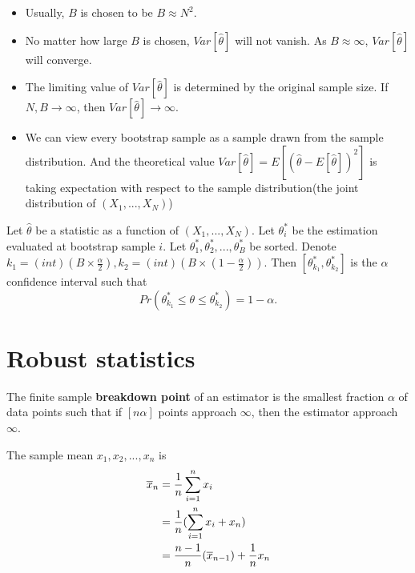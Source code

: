 \begin{refsection}
\begin{remark}[interpretation]\hfill
	\begin{itemize}
		\item Usually, $B$ is chosen to be $B \approx N^2$. 
		\item No matter how large $B$ is chosen, $Var[\hat{\theta}]$ will not vanish. As $B\approx \infty$, $Var[\hat{\theta}]$ will converge.
		\item The limiting value of $Var[\hat{\theta}]$ is determined by the original sample size. If $N,B\to \infty$, then $Var[\hat{\theta}]\to \infty$.
		\item We can view every bootstrap sample as a sample drawn from the sample distribution. And the theoretical value $Var[\hat{\theta}] = E[(\hat{\theta} - E[\hat{\theta}])^2]$ is taking expectation with respect to the sample distribution(the joint distribution of $(X_1,...,X_N)$)
	\end{itemize}
\end{remark}

\begin{definition}
	Let $\hat{\theta}$ be a statistic as a function of $(X_1,...,X_N)$. Let $\theta^*_i$ be the estimation evaluated at bootstrap sample $i$. Let $\theta_1^*,\theta_2^*,...,\theta_B^*$ be sorted.
Denote $k_1 = (int)(B\times \frac{\alpha}{2}),k_2=(int)(B\times (1-\frac{\alpha}{2})).$	
Then $[\theta_{k_1}^*,\theta_{k_2}^*]$ is the $\alpha$ confidence interval such that
$$Pr(\theta_{k_1}^*\leq \theta\leq \theta_{k_2}^*) = 1-\alpha.$$
\end{definition}


\begin{definition}
\end{definition}



\section{Robust statistics}

\begin{definition}
The finite sample \textbf{breakdown point} of an estimator is the smallest fraction $\alpha$ of data points such that if $[n\alpha]$ points approach $\infty$, then the estimator approach $\infty$.	
\end{definition}

\begin{example}
The sample mean $x_1,x_2,...,x_n$ is
\begin{align*}
\overline{x}_n &= \frac{1}{n}\sum_{i=1}^{n} x_i \\
&=\frac{1}{n}(\sum_{i=1}^{n} x_i + x_n) \\
&=\frac{n-1}{n}(\overline{x}_{n-1}) + \frac{1}{n}x_n \\
\end{align*}	
\end{example}


\end{refsection}
